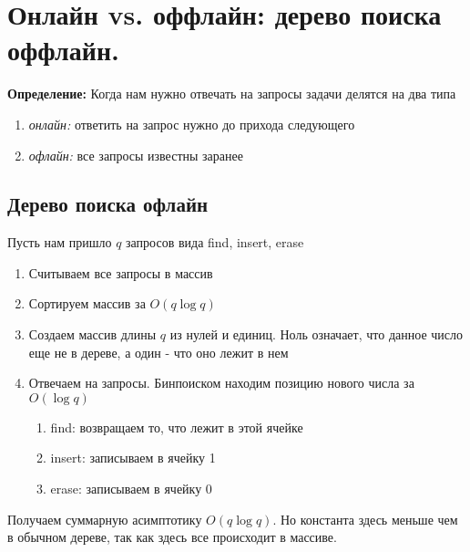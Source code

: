 \setcounter{section}{67}
\section{Онлайн vs. оффлайн: дерево поиска оффлайн.}
\textbf{Определение:} Когда нам нужно отвечать на запросы задачи делятся на два типа
\begin{enumerate}
    \item \textit{онлайн:} ответить на запрос нужно до прихода следующего
    \item \textit{офлайн:} все запросы известны заранее
\end{enumerate}
\subsection*{Дерево поиска офлайн}
\par Пусть нам пришло $q$ запросов вида find, insert, erase
\begin{enumerate}
    \item Считываем все запросы в массив
    \item Сортируем массив за $O(q \log q)$
    \item Создаем массив длины $q$ из нулей и единиц. Ноль означает, что данное число еще не в дереве, а один - что оно лежит в нем
    \item Отвечаем на запросы. Бинпоиском находим позицию нового числа за $O(\log q) $\begin{enumerate}
        \item find: возвращаем то, что лежит в этой ячейке
        \item insert: записываем в ячейку 1
        \item erase: записываем в ячейку 0
    \end{enumerate}
\end{enumerate}
\par Получаем суммарную асимптотику $O(q \log q)$. Но константа здесь меньше чем в обычном дереве, так как здесь все происходит в массиве.
\setcounter{section}{68}
